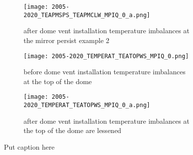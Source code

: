 \begin{figure*}
\begin{subfigure}{0.33\textwidth}
    \centering
    \texttt{[image: 2005-2020\_TEAPMSPS\_TEAPMCLW\_MPIQ\_0\_a.png]}
    \caption{after dome vent installation temperature imbalances at the mirror persist example 2}
    \label{fig:my_label}
\end{subfigure}
\begin{subfigure}{0.33\textwidth}
    \centering
    \texttt{[image: 2005-2020\_TEMPERAT\_TEATOPWS\_MPIQ\_0.png]}
    \caption{before dome vent installation temperature imbalances at the top of the dome}
    \label{fig:my_label}
\end{subfigure}
\begin{subfigure}{0.33\textwidth}
    \centering
    \texttt{[image: 2005-2020\_TEMPERAT\_TEATOPWS\_MPIQ\_0\_a.png]}
    \caption{after dome vent installation temperature imbalances at the top of the dome are lessened}
    \label{fig:my_label}
\end{subfigure}
\caption{Put caption here}
\label{fig:eda}
\end{figure*}
